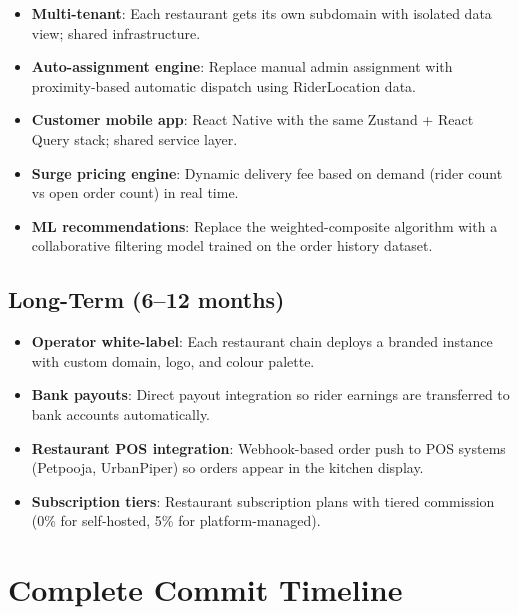 \documentclass[11pt,a4paper,twoside]{book}
\begin{document}
\begin{itemize}[leftmargin=1.4em]
  \item \textbf{Multi-tenant}: Each restaurant gets its own subdomain with
        isolated data view; shared infrastructure.
  \item \textbf{Auto-assignment engine}: Replace manual admin assignment with
        proximity-based automatic dispatch using RiderLocation data.
  \item \textbf{Customer mobile app}: React Native with the same Zustand + React
        Query stack; shared service layer.
  \item \textbf{Surge pricing engine}: Dynamic delivery fee based on demand
        (rider count vs open order count) in real time.
  \item \textbf{ML recommendations}: Replace the weighted-composite algorithm
        with a collaborative filtering model trained on the order history dataset.
\end{itemize}

\section{Long-Term (6–12 months)}

\begin{itemize}[leftmargin=1.4em]
  \item \textbf{Operator white-label}: Each restaurant chain deploys a branded
        instance with custom domain, logo, and colour palette.
  \item \textbf{Bank payouts}: Direct payout integration so rider earnings are
        transferred to bank accounts automatically.
  \item \textbf{Restaurant POS integration}: Webhook-based order push to POS
        systems (Petpooja, UrbanPiper) so orders appear in the kitchen display.
  \item \textbf{Subscription tiers}: Restaurant subscription plans with tiered
        commission (0\% for self-hosted, 5\% for platform-managed).
\end{itemize}

\appendix

\chapter{Complete Commit Timeline}
\end{document}
